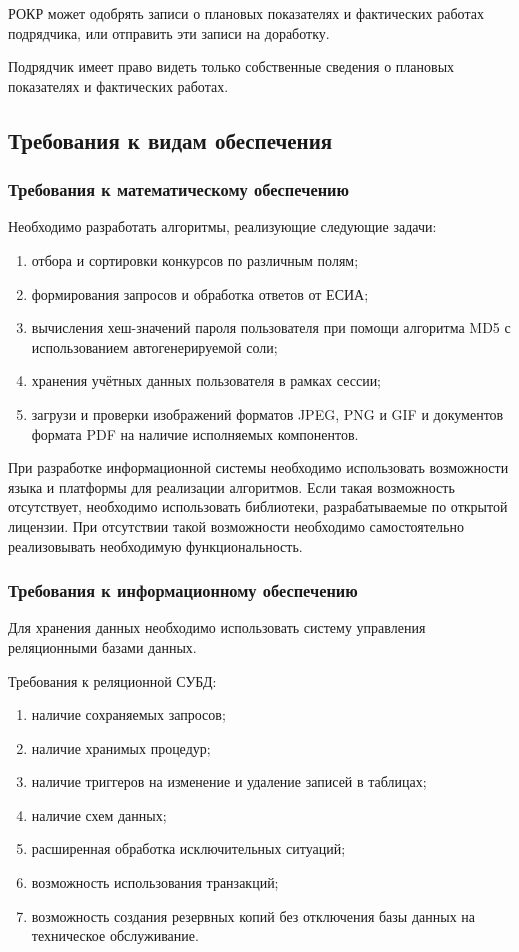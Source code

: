 РОКР может одобрять записи о плановых показателях и фактических работах подрядчика, или отправить эти записи на доработку.

Подрядчик имеет право видеть только собственные сведения о плановых показателях и фактических работах.

\subsection{Требования к видам обеспечения}

\subsubsection{Требования к математическому обеспечению}

Необходимо разработать алгоритмы, реализующие следующие задачи:

\begin{enumerate}
	\item отбора и сортировки конкурсов по различным полям;
	\item формирования запросов и обработка ответов от ЕСИА;
	\item вычисления хеш-значений пароля пользователя при помощи алгоритма MD5 с использованием автогенерируемой соли;
	\item хранения учётных данных пользователя в рамках сессии;
	\item загрузи и проверки изображений форматов JPEG, PNG и GIF и документов формата PDF на наличие исполняемых компонентов.
\end{enumerate}

При разработке информационной системы необходимо использовать возможности языка и платформы для реализации алгоритмов.
Если такая возможность отсутствует, необходимо использовать библиотеки, разрабатываемые по открытой лицензии.
При отсутствии такой возможности необходимо самостоятельно реализовывать необходимую функциональность.

\subsubsection{Требования к информационному обеспечению}

Для хранения данных необходимо использовать систему управления реляционными базами данных.

Требования к реляционной СУБД:
\begin{enumerate}
	\item наличие сохраняемых запросов;
	\item наличие хранимых процедур;
	\item наличие триггеров на изменение и удаление записей в таблицах;
	\item наличие схем данных;
	\item расширенная обработка исключительных ситуаций;
	\item возможность использования транзакций;
	\item возможность создания резервных копий без отключения базы данных на техническое обслуживание.
\end{enumerate}

